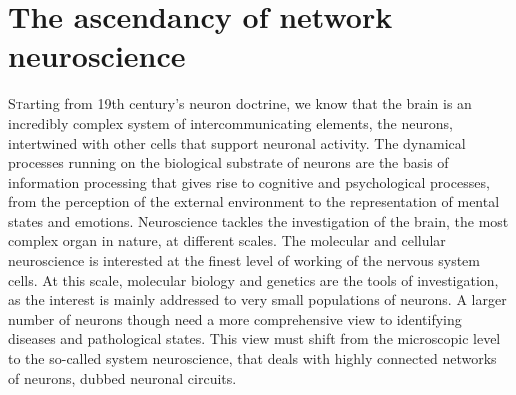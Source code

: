 
\bigbreak

\section{The ascendancy of network neuroscience}
\lettrine{S}{t}arting from 19th century’s neuron doctrine, we know that the brain is an incredibly complex system of intercommunicating elements, the neurons, intertwined with other cells that support neuronal activity. 
The dynamical processes running on the biological substrate of neurons are the basis of information processing that gives rise to cognitive and psychological processes, from the perception of the external environment to the representation of mental states and emotions.
Neuroscience tackles the investigation of the brain, the most complex organ in nature, at different scales. The molecular and cellular neuroscience is interested at the finest level of working of the nervous system cells. At this scale, molecular biology and genetics are the tools of investigation, as the interest is mainly addressed to very small populations of neurons. 
A larger number of neurons though need a more comprehensive view to identifying diseases and pathological states. This view must shift from the microscopic level to the so-called system neuroscience, that deals with highly connected networks of neurons, dubbed neuronal circuits.

